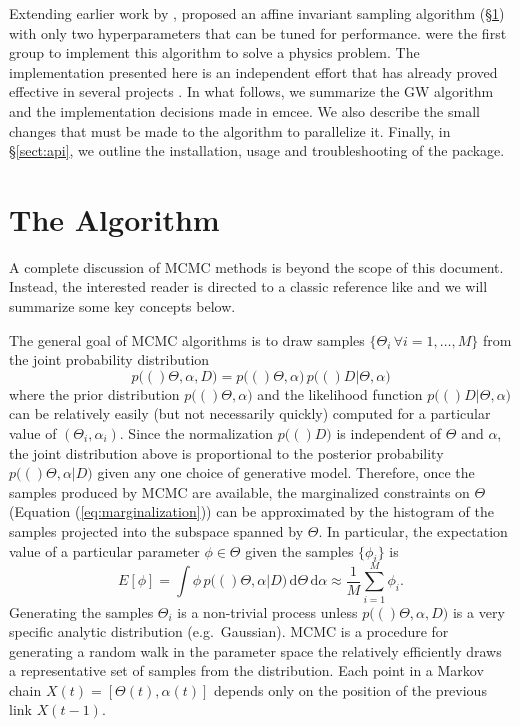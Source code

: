 \documentclass[12pt,preprint]{aastex}
\newcommand{\project}[1]{{\sffamily #1}}
\newcommand{\thisplain}{emcee}
\newcommand{\this}{\project{\thisplain}}
\newcommand{\paper}{document}
\newcommand{\eq}[1]{Equation (\ref{eq:#1})}
\newcommand{\sect}[1]{\S\ref{sect:#1}}
\newcommand{\sectlabel}[1]{\label{sect:#1}}
\newcommand{\dd}{\mathrm{d}}
\renewcommand{\vector}[1]{#1}
\newcommand{\pr}[1]{\ensuremath{p(#1)}}
\newcommand{\model}{\ensuremath{\vector{\Theta}}}
\newcommand{\data}{\ensuremath{\vector{D}}}
\newcommand{\nuisance}{\ensuremath{\vector{\alpha}}}
\newcommand{\link}{\ensuremath{X}}
\begin{document}
Extending earlier work by \citet{Christen:2007},
\citet[][hereafter ]{Goodman:2010} proposed an
affine invariant sampling
algorithm (\sect{algo}) with only two hyperparameters that can be tuned for
performance. \citet{Hou:2011} were the first group to implement this
algorithm to solve a physics problem. The implementation presented here is
an independent effort that has already proved effective in several projects
\citep[][Foreman-Mackey \& Widrow~2012, in prep.]{Lang:2011,
Bovy:2011, Dorman:2012}.
In what follows, we summarize the GW algorithm and the implementation
decisions made in \this. We also describe the small changes
that must be made to the algorithm to parallelize it. Finally, in \sect{api},
we outline the installation, usage and troubleshooting of the package.

\section{The Algorithm}\sectlabel{algo}

A complete discussion of MCMC methods is beyond the scope of this \paper.
Instead, the interested reader is directed to a classic reference like
\citet{MacKay:2003} and we will summarize some key concepts below.

The general goal of MCMC algorithms is to draw samples
$\{ \model_i \, \forall i=1, \ldots, M \}$ from
the joint probability distribution
\begin{equation}
    \pr (\model, \nuisance, \data) = \pr (\model, \nuisance)
            \, \pr (\data | \model, \nuisance)
\end{equation}
where the prior distribution $\pr (\model, \nuisance)$ and the likelihood
function $\pr (\data|\model,\nuisance)$ can be relatively easily (but not
necessarily quickly) computed for a particular value of
$(\model_i, \nuisance_i)$. Since the normalization $\pr (\data)$ is
independent of $\model$ and $\nuisance$, the joint distribution above is
proportional to the posterior probability $\pr (\model, \nuisance | \data)$
given any one choice of generative model. Therefore, once the samples
produced by MCMC are available, the marginalized constraints on $\model$
(\eq{marginalization}) can be approximated by the histogram of the samples
projected into the subspace spanned by $\model$. In particular, the
expectation value of a particular parameter $\phi \in \model$ given the
samples $\{ \phi_i \}$ is
\begin{equation}
    E[\phi] = \int \phi \, \pr ( \model, \nuisance | \data )
            \, \dd \model \, \dd \nuisance
            \approx \frac{1}{M} \sum_{i=1} ^M \phi_i .
\end{equation}
Generating the samples $\model_i$ is a non-trivial process unless
$\pr (\model, \nuisance, \data)$ is a very specific analytic distribution
(e.g.~Gaussian). MCMC is a procedure for generating a random walk in the
parameter space the relatively efficiently draws a representative set of
samples from the distribution. Each point in a Markov chain
$\link (t) = [\model(t), \nuisance(t)]$
depends only on the position of the previous link $\link (t-1)$.
\end{document}
